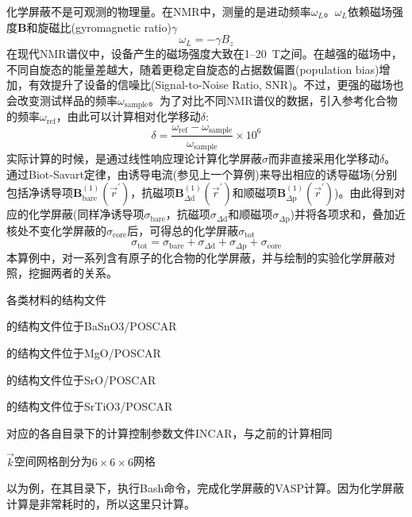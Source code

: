 化学屏蔽不是可观测的物理量。在\textrm{NMR}中，测量的是进动频率$\omega_L$。$\omega_L$依赖磁场强度$\mathbf{B}$和旋磁比\textrm{(gyromagnetic ratio)}$\gamma$
\begin{displaymath}
	\omega_L=-\gamma B_z
\end{displaymath}
在现代\textrm{NMR}谱仪中，设备产生的磁场强度大致在\textrm{1–20~T}之间。在越强的磁场中，不同自旋态的能量差越大，随着更稳定自旋态的占据数偏置\textrm{(population bias)}增加，有效提升了设备的信噪比\textrm{(Signal-to-Noise Ratio, SNR)}。不过，更强的磁场也会改变测试样品的频率$\omega_{\mathrm{sample}}$。为了对比不同\textrm{NMR}谱仪的数据，引入参考化合物的频率$\omega_{\mathrm{ref}}$，由此可以计算相对化学移动$\delta$:
\begin{displaymath}
	\delta=\dfrac{\omega_{\mathrm{ref}}-\omega_{\mathrm{sample}}}{\omega_{\mathrm{sample}}}\times10^6
\end{displaymath}
实际计算的时候，是通过线性响应理论计算化学屏蔽$\sigma$而非直接采用化学移动$\delta$。通过\textrm{Biot-Savart}定律，由诱导电流(参见上一个算例)来导出相应的诱导磁场(分别包括净诱导项$\mathbf{B}_{\mathrm{bare}}^{(1)}(\vec r^{\prime})$，抗磁项$\mathbf{B}_{\Delta\mathrm{d}}^{(1)}(\vec r^{\prime})$和顺磁项$\mathbf{B}_{\Delta\mathrm{p}}^{(1)}(\vec r^{\prime})$)。由此得到对应的化学屏蔽(同样净诱导项$\sigma_{\mathrm{bare}}$，抗磁项$\sigma_{\Delta\mathrm{d}}$和顺磁项$\sigma_{\Delta\mathrm{p}}$)并将各项求和，叠加近核处不变化学屏蔽的$\sigma_{\mathrm{core}}$后，可得总的化学屏蔽$\sigma_{\mathrm{tot}}$
\begin{displaymath}
	\sigma_{\mathrm{tot}}=\sigma_{\mathrm{bare}}+\sigma_{\Delta\mathrm{d}}+\sigma_{\Delta\mathrm{p}}+\sigma_{\mathrm{core}}
\end{displaymath}
本算例中，对一系列含有原子的化合物的化学屏蔽，并与绘制的实验化学屏蔽对照，挖掘两者的关系。

各类材料的结构文件

的结构文件位于\textrm{BaSnO3/POSCAR}

的结构文件位于\textrm{MgO/POSCAR}

的结构文件位于\textrm{SrO/POSCAR}

的结构文件位于\textrm{SrTiO3/POSCAR}

对应的各自目录下的计算控制参数文件\textrm{INCAR}，与之前的计算相同

$\vec k$空间网格剖分为$6\times6\times6$网格

以为例，在其目录下，执行\textrm{Bash}命令，完成化学屏蔽的\textrm{VASP}计算。因为化学屏蔽计算是非常耗时的，所以这里只计算。

